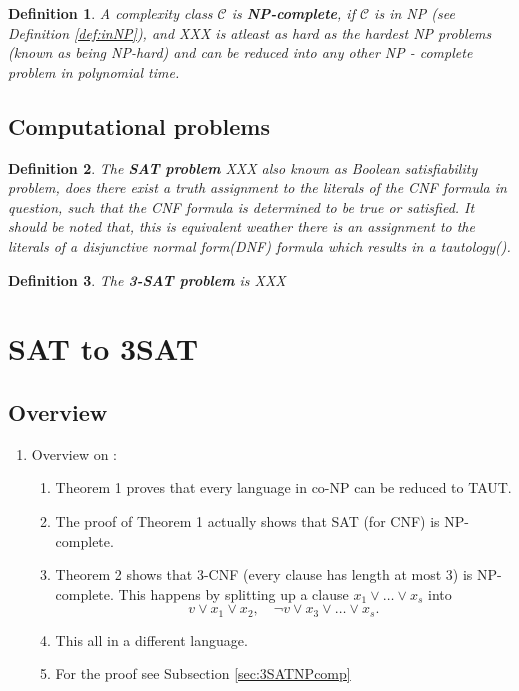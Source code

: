 \documentclass[a4paper]{report}
\newtheorem{defi}{Definition}[section]
\begin{document}
\begin{defi}\label{def:NPcomplete}
  A complexity class $\mathcal{C}$ is \textbf{NP-complete}, if $\mathcal{C}$ is in NP (see Definition \ref{def:inNP}), and XXX is atleast as hard as the hardest NP problems (known as being NP-hard) and can be reduced into any other NP - complete problem in polynomial time.
\end{defi}


\section{Computational problems}
\label{sec:computationalproblems}

\begin{defi}\label{def:SATproblem}
  The \textbf{SAT problem} XXX also known as Boolean satisfiability problem, does there exist a truth assignment to the literals of the CNF formula in question, such that the CNF formula is determined to be true or satisfied. It should be noted that, this is equivalent weather there is an assignment to the literals of a disjunctive normal form(DNF) formula which results in a tautology(\cite{Karp1972NP}).
\end{defi}

\begin{defi}\label{def:3SATproblem}
  The \textbf{3-SAT problem} is XXX
\end{defi}




\chapter{SAT to 3SAT}
\label{cha:sat13}


\section{Overview}
\label{sec:sat13Overview}

\begin{enumerate}
\item Overview on \cite{Cook1971NP}:
  \begin{enumerate}
  \item Theorem 1 proves that every language in co-NP can be reduced to TAUT.
  \item The proof of Theorem 1 actually shows that SAT (for CNF) is NP-complete.
  \item Theorem 2 shows that 3-CNF (every clause has length at most 3) is NP-complete. This happens by splitting up a clause $x_1 \vee \dots \vee x_s$ into
    \begin{displaymath}
      v \vee x_1 \vee x_2, \quad \neg v \vee x_3 \vee \dots \vee x_s.
    \end{displaymath}
  \item This all in a different language.
  \item For the proof see Subsection \ref{sec:3SATNPcomp}
  \end{enumerate}
\end{enumerate}
\end{document}
